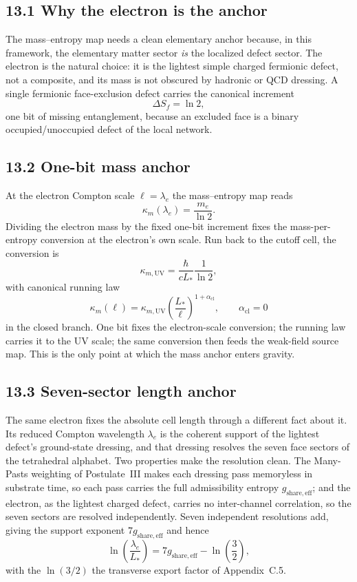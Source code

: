 \documentclass[11pt]{article}
\begin{document}
\subsection{13.1 Why the electron is the anchor}

The mass--entropy map needs a clean elementary anchor because, in this framework, the elementary matter sector \emph{is} the localized defect sector. The electron is the natural choice: it is the lightest simple charged fermionic defect, not a composite, and its mass is not obscured by hadronic or QCD dressing. A single fermionic face-exclusion defect carries the canonical increment
\[
\Delta S_f=\ln 2,
\]
one bit of missing entanglement, because an excluded face is a binary occupied/unoccupied defect of the local network.

\subsection{13.2 One-bit mass anchor}

At the electron Compton scale $\ell=\lambda_e$ the mass--entropy map reads
\[
\kappa_m(\lambda_e)=\frac{m_e}{\ln 2}.
\]
Dividing the electron mass by the fixed one-bit increment fixes the mass-per-entropy conversion at the electron's own scale. Run back to the cutoff cell, the conversion is
\[
\kappa_{m,\mathrm{UV}}=\frac{\hbar}{cL_*}\frac{1}{\ln 2},
\]
with canonical running law
\[
\kappa_m(\ell)=\kappa_{m,\mathrm{UV}}\left(\frac{L_*}{\ell}\right)^{1+\alpha_{\mathrm{cl}}},
\qquad
\alpha_{\mathrm{cl}}=0
\]
in the closed branch. One bit fixes the electron-scale conversion; the running law carries it to the UV scale; the same conversion then feeds the weak-field source map. This is the only point at which the mass anchor enters gravity.

\subsection{13.3 Seven-sector length anchor}

The same electron fixes the absolute cell length through a different fact about it. Its reduced Compton wavelength $\lambda_e$ is the coherent support of the lightest defect's ground-state dressing, and that dressing resolves the seven face sectors of the tetrahedral alphabet. Two properties make the resolution clean. The Many-Pasts weighting of Postulate~III makes each dressing pass memoryless in substrate time, so each pass carries the full admissibility entropy $g_{\mathrm{share,eff}}$; and the electron, as the lightest charged defect, carries no inter-channel correlation, so the seven sectors are resolved independently. Seven independent resolutions add, giving the support exponent $7g_{\mathrm{share,eff}}$ and hence
\[
\ln\!\left(\frac{\lambda_e}{L_*}\right)
=
7g_{\mathrm{share,eff}}-\ln\!\left(\frac32\right),
\]
with the $\ln(3/2)$ the transverse export factor of Appendix~C.5.
\end{document}

